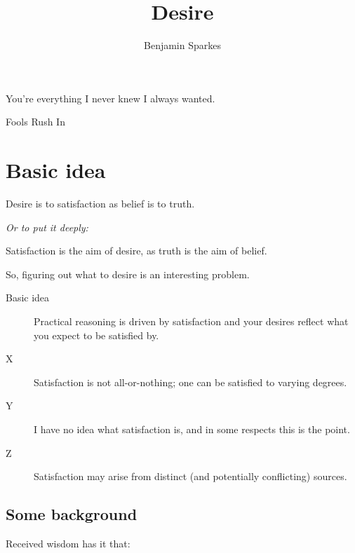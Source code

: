 \documentclass[10pt]{article}
\title{Desire}
\author{Benjamin Sparkes}
\begin{document}
\maketitle
\epigraph{You're everything I never knew I always wanted.}{Fools Rush In}



\section{Basic idea}
\label{sec:basic-idea}


\begin{center}
  Desire is to satisfaction as belief is to truth.

  \emph{Or to put it deeply:}

  Satisfaction is the aim of desire, as truth is the aim of belief.
\end{center}

So, figuring out what to desire is an interesting problem.

\begin{description}
\item[Basic idea] Practical reasoning is driven by satisfaction and your desires reflect what you expect to be satisfied by.
\item[X] Satisfaction is not all-or-nothing; one can be satisfied to varying degrees.
\item[Y] I have no idea what satisfaction is, and in some respects this is the point.
\item[Z] Satisfaction may arise from distinct (and potentially conflicting) sources.
\end{description}


\subsection{Some background}
\label{sec:some-background}

Received wisdom has it that:
\end{document}
